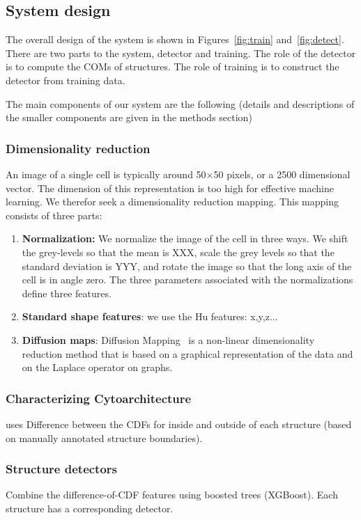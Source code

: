 \documentclass[runningheads]{llncs}
\begin{document}
\subsection{System design}


The overall design of the system is shown in Figures~\ref{fig:train}
and~\ref{fig:detect}. There are two parts to the system, detector and training. The role of
the detector is to compute the COMs of structures. The role of
training is to construct the detector from training data.

The main components of our system are the following (details and
descriptions of the smaller components are given in the methods
section)

\subsubsection{ Dimensionality reduction} 
An image of a single cell is typically around 50$\times$50 pixels, or a 2500 dimensional vector. The dimension of this representation is too high for effective machine learning. We therefor seek a dimensionality reduction mapping. This mapping consists of three parts:
\begin{enumerate}
    \item {\bf Normalization:} We normalize the image of the cell in three ways. We 
    shift the grey-levels so that the mean is XXX, scale the grey levels so that the standard deviation is YYY, and rotate the image so that the long axis of the cell is in angle zero. The three parameters associated with the normalizations define three features.
    \item {\bf Standard shape features}: we use the Hu features: x,y,z...
    \item{ \bf  Diffusion maps}: Diffusion Mapping~\cite{Belkin,
        Coifman} is a non-linear dimensionality reduction method that
      is based on a graphical representation of the data and on the
      Laplace operator on graphs.
      \end{enumerate}
\subsubsection{ Characterizing Cytoarchitecture} uses Difference between the CDFs for inside and outside of each structure (based on manually annotated structure boundaries). 
\subsubsection { Structure detectors} Combine the difference-of-CDF features using boosted trees (XGBoost). Each structure has a corresponding detector.
\end{document}
